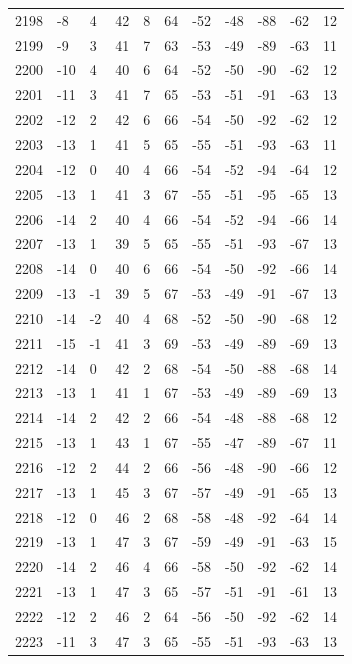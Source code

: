 \begin{table}[H]
\begin{tabular}{lllllllllll}
2198 & -8 & 4 & 42 & 8 & 64 & -52 & -48 & -88 & -62 & 12 \\
2199 & -9 & 3 & 41 & 7 & 63 & -53 & -49 & -89 & -63 & 11 \\
2200 & -10 & 4 & 40 & 6 & 64 & -52 & -50 & -90 & -62 & 12 \\
2201 & -11 & 3 & 41 & 7 & 65 & -53 & -51 & -91 & -63 & 13 \\
2202 & -12 & 2 & 42 & 6 & 66 & -54 & -50 & -92 & -62 & 12 \\
2203 & -13 & 1 & 41 & 5 & 65 & -55 & -51 & -93 & -63 & 11 \\
2204 & -12 & 0 & 40 & 4 & 66 & -54 & -52 & -94 & -64 & 12 \\
2205 & -13 & 1 & 41 & 3 & 67 & -55 & -51 & -95 & -65 & 13 \\
2206 & -14 & 2 & 40 & 4 & 66 & -54 & -52 & -94 & -66 & 14 \\
2207 & -13 & 1 & 39 & 5 & 65 & -55 & -51 & -93 & -67 & 13 \\
2208 & -14 & 0 & 40 & 6 & 66 & -54 & -50 & -92 & -66 & 14 \\
2209 & -13 & -1 & 39 & 5 & 67 & -53 & -49 & -91 & -67 & 13 \\
2210 & -14 & -2 & 40 & 4 & 68 & -52 & -50 & -90 & -68 & 12 \\
2211 & -15 & -1 & 41 & 3 & 69 & -53 & -49 & -89 & -69 & 13 \\
2212 & -14 & 0 & 42 & 2 & 68 & -54 & -50 & -88 & -68 & 14 \\
2213 & -13 & 1 & 41 & 1 & 67 & -53 & -49 & -89 & -69 & 13 \\
2214 & -14 & 2 & 42 & 2 & 66 & -54 & -48 & -88 & -68 & 12 \\
2215 & -13 & 1 & 43 & 1 & 67 & -55 & -47 & -89 & -67 & 11 \\
2216 & -12 & 2 & 44 & 2 & 66 & -56 & -48 & -90 & -66 & 12 \\
2217 & -13 & 1 & 45 & 3 & 67 & -57 & -49 & -91 & -65 & 13 \\
2218 & -12 & 0 & 46 & 2 & 68 & -58 & -48 & -92 & -64 & 14 \\
2219 & -13 & 1 & 47 & 3 & 67 & -59 & -49 & -91 & -63 & 15 \\
2220 & -14 & 2 & 46 & 4 & 66 & -58 & -50 & -92 & -62 & 14 \\
2221 & -13 & 1 & 47 & 3 & 65 & -57 & -51 & -91 & -61 & 13 \\
2222 & -12 & 2 & 46 & 2 & 64 & -56 & -50 & -92 & -62 & 14 \\
2223 & -11 & 3 & 47 & 3 & 65 & -55 & -51 & -93 & -63 & 13 \\

\end{tabular}
\end{table}
